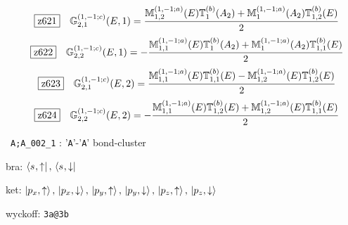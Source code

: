 \documentclass[fleqn,10pt,landscape]{jsarticle}
\begin{document}
\begin{dmath*}
\hspace*{3mm}\fbox{z621}\quad \mathbb{G}_{2,1}^{(1,-1;c)}(E,1)=\frac{\mathbb{M}_{1,2}^{(1,-1;a)}(E) \mathbb{T}_{1}^{(b)}(A_{2}) + \mathbb{M}_{1}^{(1,-1;a)}(A_{2}) \mathbb{T}_{1,2}^{(b)}(E)}{2}
\end{dmath*}
\begin{dmath*}
\hspace*{3mm}\fbox{z622}\quad \mathbb{G}_{2,2}^{(1,-1;c)}(E,1)=- \frac{\mathbb{M}_{1,1}^{(1,-1;a)}(E) \mathbb{T}_{1}^{(b)}(A_{2}) + \mathbb{M}_{1}^{(1,-1;a)}(A_{2}) \mathbb{T}_{1,1}^{(b)}(E)}{2}
\end{dmath*}
\begin{dmath*}
\hspace*{3mm}\fbox{z623}\quad \mathbb{G}_{2,1}^{(1,-1;c)}(E,2)=\frac{\mathbb{M}_{1,1}^{(1,-1;a)}(E) \mathbb{T}_{1,1}^{(b)}(E) - \mathbb{M}_{1,2}^{(1,-1;a)}(E) \mathbb{T}_{1,2}^{(b)}(E)}{2}
\end{dmath*}
\begin{dmath*}
\hspace*{3mm}\fbox{z624}\quad \mathbb{G}_{2,2}^{(1,-1;c)}(E,2)=- \frac{\mathbb{M}_{1,1}^{(1,-1;a)}(E) \mathbb{T}_{1,2}^{(b)}(E) + \mathbb{M}_{1,2}^{(1,-1;a)}(E) \mathbb{T}_{1,1}^{(b)}(E)}{2}
\end{dmath*}
\vspace{5mm}

\noindent\textbullet\, \texttt{A;A_002_1} : '\texttt{A}'-'\texttt{A}' bond-cluster

\noindent\quad * bra: $\bra{s_{},\uparrow},\, \bra{s_{},\downarrow}$

\noindent\quad * ket: $\ket{p_{x},\uparrow},\, \ket{p_{x},\downarrow},\, \ket{p_{y},\uparrow},\, \ket{p_{y},\downarrow},\, \ket{p_{z},\uparrow},\, \ket{p_{z},\downarrow}$

\noindent\quad * wyckoff: \texttt{3a@3b}
\end{document}
